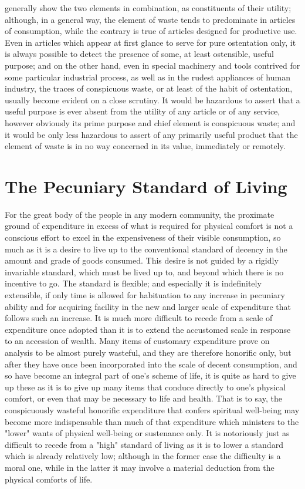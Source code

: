 \documentclass[12pt]{report}
\begin{document}
generally show the two elements in combination, as constituents of
their utility; although, in a general way, the element of waste tends
to predominate in articles of consumption, while the contrary is true of
articles designed for productive use. Even in articles which appear at
first glance to serve for pure ostentation only, it is always possible
to detect the presence of some, at least ostensible, useful purpose;
and on the other hand, even in special machinery and tools contrived for
some particular industrial process, as well as in the rudest appliances
of human industry, the traces of conspicuous waste, or at least of the
habit of ostentation, usually become evident on a close scrutiny. It
would be hazardous to assert that a useful purpose is ever absent from
the utility of any article or of any service, however obviously its
prime purpose and chief element is conspicuous waste; and it would be
only less hazardous to assert of any primarily useful product that the
element of waste is in no way concerned in its value, immediately or
remotely.




\chapter{The Pecuniary Standard of Living}
For the great body of the people in any modern community, the proximate
ground of expenditure in excess of what is required for physical comfort
is not a conscious effort to excel in the expensiveness of their visible
consumption, so much as it is a desire to live up to the conventional
standard of decency in the amount and grade of goods consumed. This
desire is not guided by a rigidly invariable standard, which must be
lived up to, and beyond which there is no incentive to go. The standard
is flexible; and especially it is indefinitely extensible, if only time
is allowed for habituation to any increase in pecuniary ability and
for acquiring facility in the new and larger scale of expenditure that
follows such an increase. It is much more difficult to recede from a
scale of expenditure once adopted than it is to extend the accustomed
scale in response to an accession of wealth. Many items of customary
expenditure prove on analysis to be almost purely wasteful, and they
are therefore honorific only, but after they have once been incorporated
into the scale of decent consumption, and so have become an integral
part of one's scheme of life, it is quite as hard to give up these as
it is to give up many items that conduce directly to one's physical
comfort, or even that may be necessary to life and health. That is
to say, the conspicuously wasteful honorific expenditure that confers
spiritual well-being may become more indispensable than much of that
expenditure which ministers to the "lower" wants of physical well-being
or sustenance only. It is notoriously just as difficult to recede from a
"high" standard of living as it is to lower a standard which is already
relatively low; although in the former case the difficulty is a moral
one, while in the latter it may involve a material deduction from the
physical comforts of life.
\end{document}
